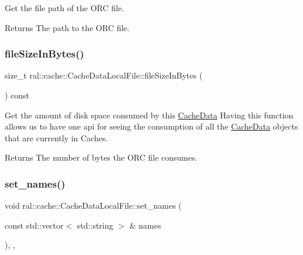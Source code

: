 Get the file path of the O\+RC file. \begin{DoxyReturn}{Returns}
The path to the O\+RC file. 
\end{DoxyReturn}
\mbox{\label{classral_1_1cache_1_1CacheDataLocalFile_abc8a4d9edc7ffa21f15010c60a71189b}} 
\subsubsection{\texorpdfstring{file\+Size\+In\+Bytes()}{fileSizeInBytes()}}
{\footnotesize\ttfamily size\+\_\+t ral\+::cache\+::\+Cache\+Data\+Local\+File\+::file\+Size\+In\+Bytes (\begin{DoxyParamCaption}{ }\end{DoxyParamCaption}) const}

Get the amount of disk space consumed by this \hyperlink{classral_1_1cache_1_1CacheData}{Cache\+Data} Having this function allows us to have one api for seeing the consumption of all the \hyperlink{classral_1_1cache_1_1CacheData}{Cache\+Data} objects that are currently in Caches. \begin{DoxyReturn}{Returns}
The number of bytes the O\+RC file consumes. 
\end{DoxyReturn}
\mbox{\label{classral_1_1cache_1_1CacheDataLocalFile_a49c8d137ef2d0a30ee59025f91725567}} 
\subsubsection{\texorpdfstring{set\+\_\+names()}{set\_names()}}
{\footnotesize\ttfamily void ral\+::cache\+::\+Cache\+Data\+Local\+File\+::set\+\_\+names (\begin{DoxyParamCaption}\item[{const std\+::vector$<$ std\+::string $>$ \&}]{names }\end{DoxyParamCaption})\hspace{0.3cm}{\ttfamily [inline]}, {\ttfamily [override]}, {\ttfamily [virtual]}}

